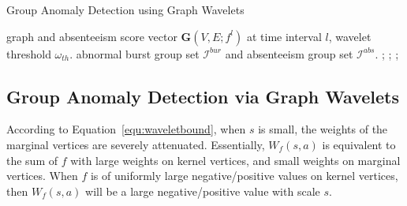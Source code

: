 \begin{algorithm}[t]
\centering
\caption{Group Anomaly Detection using Graph Wavelets}
{\footnotesize \begin{algorithmic}[1]
 graph and absenteeism score vector $\mathbf{G}(V,E;f^l)$ at time interval $l$, wavelet threshold $\omega_{th}$.
 abnormal burst group set $\mathcal{I}^{bur}$ and absenteeism group set $\mathcal{I}^{abs}$.	;
;
	    ;
	    \ENDIF
	
	    \ENDIF	
	
\ENDFOR	
{}
\end{algorithmic}}
\label{algo:event_detection1}
\end{algorithm}



\subsection{Group Anomaly Detection via Graph Wavelets}
\label{sec:Group_Anomaly_Detection_via_graph_wavelet}
According to Equation~\ref{equ:waveletbound}, when $s$ is small, the weights of the marginal vertices are severely attenuated.
Essentially, $W_f(s,a)$ is equivalent to the sum of $f$ with large weights on kernel vertices, and small weights on marginal vertices.
When $f$ is of uniformly large negative/positive values on kernel vertices, then $W_f(s,a)$ will be a large negative/positive value with scale $s$.

